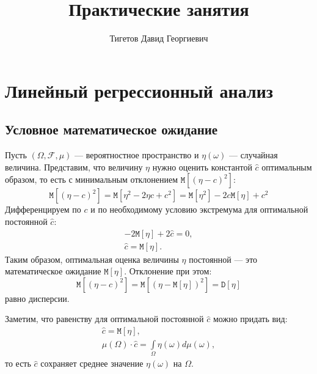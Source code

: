 \documentclass[a4paper,12pt]{article}
\newcommand{\expectation}[1]{\texttt{M} \left[ #1 \right]}
\newcommand{\variance}[1]{\texttt{D} \left[ #1 \right]}
\begin{document}
\title{Практические занятия}
\author{Тигетов Давид Георгиевич}
\maketitle

\setcounter{section}{5}

\section{Линейный регрессионный анализ}

\subsection*{Условное математическое ожидание}

Пусть $(\Omega, \mathcal{F}, \mu)$ --- вероятностное пространство и $\eta(\omega)$ --- случайная величина. Представим, что величину
$\eta$ нужно оценить константой $\widehat{c}$ оптимальным образом, то есть с минимальным отклонением $\expectation{(\eta - c)^2}$:
\[
    \expectation{(\eta - c)^2}
    = \expectation{\eta^2 - 2 \eta c + c^2}
    = \expectation{\eta^2} - 2 c \expectation{\eta} + c^2
\]
Дифференцируем по $c$ и по необходимому условию экстремума для оптимальной постоянной $\widehat{c}$:
\begin{gather*}
    - 2 \expectation{\eta} + 2 \widehat{c} = 0 , \\
    \widehat{c} = \expectation{\eta}.
\end{gather*}
Таким образом, оптимальная оценка величины $\eta$ постоянной --- это математическое ожидание $\expectation{\eta}$. Отклонение при
этом:
\[
    \expectation{(\eta - c)^2}
    = \expectation{(\eta - \expectation{\eta})^2}
    = \variance{\eta}
\]
равно дисперсии.

Заметим, что равенству для оптимальной постоянной $\widehat{c}$ можно придать вид:
\begin{gather*}
    \widehat c = \expectation{\eta}, \\ 
    \mu(\Omega) \cdot \widehat c = \int \limits_\Omega \eta(\omega) d \mu(\omega) ,
\end{gather*}
то есть $\widehat{c}$ сохраняет среднее значение $\eta(\omega)$ на $\Omega$. 
\end{document}
